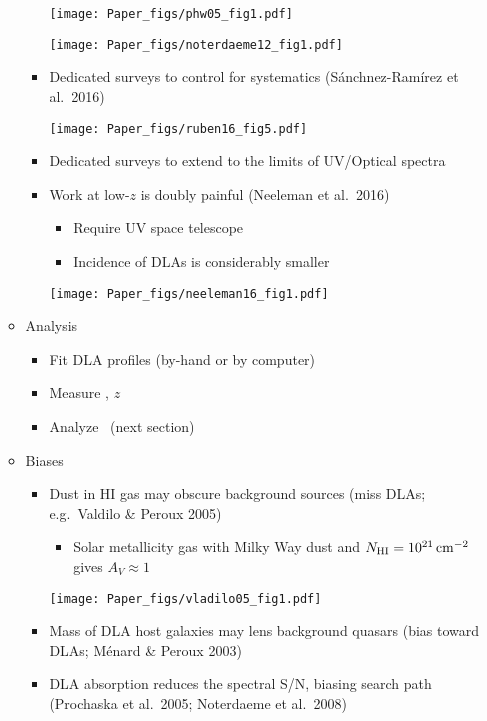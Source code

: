 \documentclass[12pt,letterpaper]{article}
\begin{document}
\begin{Aenumerate}
\begin{itemize}
\begin{itemize}
\begin{itemize}
  \texttt{[image: Paper\_figs/phw05\_fig1.pdf]}

  \texttt{[image: Paper\_figs/noterdaeme12\_fig1.pdf]}

      \item Dedicated surveys to control for systematics (S\'anchnez-Ram\'irez et al.\ 2016)

  \texttt{[image: Paper\_figs/ruben16\_fig5.pdf]}

      \item Dedicated surveys to extend to the limits of UV/Optical spectra
      \item Work at low-$z$ is doubly painful (Neeleman et al.\ 2016)
        \begin{itemize}
        \item Require UV space telescope
        \item Incidence of DLAs is considerably smaller
        \end{itemize}

  \texttt{[image: Paper\_figs/neeleman16\_fig1.pdf]}

      \end{itemize}

  \item Analysis
      \begin{itemize}
      \item Fit DLA profiles (by-hand or by computer)
      \item Measure \nhi, $z$
      \item Analyze \fnhi\ (next section)
      \end{itemize}

  \item Biases
    \begin{itemize}
    \item Dust in HI gas may obscure background sources (miss DLAs; e.g.\ Valdilo \& Peroux 2005)
      \begin{itemize}
      \item Solar metallicity gas with Milky Way dust and $N_{\rm HI} = 10^{21} \, {\rm cm^{-2}}$ gives $A_V \approx 1$
      \end{itemize}

  \texttt{[image: Paper\_figs/vladilo05\_fig1.pdf]}

    \item Mass of DLA host galaxies may lens background quasars (bias toward DLAs;
    M\'enard \& Peroux 2003)
    \item DLA absorption reduces the spectral S/N, biasing search path
    (Prochaska et al.\ 2005; Noterdaeme et al.\ 2008)
    \end{itemize}


\end{itemize}
\end{itemize}
\end{Aenumerate}
\end{document}
